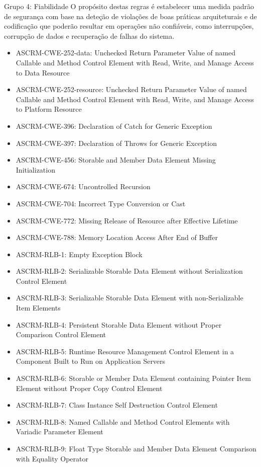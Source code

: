 \documentclass[openany,10pt,a4paper]{article}
\begin{document}
\begin{appendix}
Grupo 4: Fiabilidade
O propósito destas regras é estabelecer uma medida padrão de segurança com base na deteção de violações de boas práticas arquiteturais e de codificação que poderão resultar em operações não confiáveis, como interrupções, corrupção de dados e recuperação de falhas do sistema.
\begin{itemize}
	\setlength\itemsep{0em}
	\item ASCRM-CWE-252-data: Unchecked Return Parameter Value of named Callable and Method Control Element with Read, Write, and Manage Access to Data Resource
	\item ASCRM-CWE-252-resource: Unchecked Return Parameter Value of named Callable and Method Control Element with Read, Write, and Manage Access to Platform Resource
	\item ASCRM-CWE-396: Declaration of Catch for Generic Exception
	\item ASCRM-CWE-397: Declaration of Throws for Generic Exception
	\item ASCRM-CWE-456: Storable and Member Data Element Missing Initialization
	\item ASCRM-CWE-674: Uncontrolled Recursion
	\item ASCRM-CWE-704: Incorrect Type Conversion or Cast
	\item ASCRM-CWE-772: Missing Release of Resource after Effective Lifetime
	\item ASCRM-CWE-788: Memory Location Access After End of Buffer
	\item ASCRM-RLB-1: Empty Exception Block
	\item ASCRM-RLB-2: Serializable Storable Data Element without Serialization Control Element
	\item ASCRM-RLB-3: Serializable Storable Data Element with non-Serializable Item Elements
	\item ASCRM-RLB-4: Persistent Storable Data Element without Proper Comparison Control Element
	\item ASCRM-RLB-5: Runtime Resource Management Control Element in a Component Built to Run on Application Servers
	\item ASCRM-RLB-6: Storable or Member Data Element containing Pointer Item Element without Proper Copy Control Element
	\item ASCRM-RLB-7: Class Instance Self Destruction Control Element
	\item ASCRM-RLB-8: Named Callable and Method Control Elements with Variadic Parameter Element
	\item ASCRM-RLB-9: Float Type Storable and Member Data Element Comparison with Equality Operator

\end{itemize}
\end{appendix}
\end{document}
